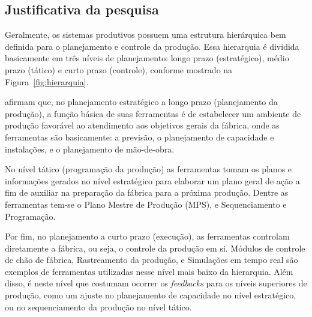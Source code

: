 \subsection{Justificativa da pesquisa} \label{subsec:justif}
    
    Geralmente, os sistemas produtivos possuem uma estrutura hierárquica bem definida para o planejamento e controle da produção. Essa hierarquia é dividida basicamente em três níveis de planejamento: longo prazo (estratégico), médio prazo (tático) e curto prazo (controle), conforme mostrado na Figura~\ref{fig:hierarquia}.
    
    
    
     afirmam que, no planejamento estratégico a longo prazo (planejamento da produção), a função básica de suas ferramentas é de estabelecer um ambiente de produção favorável ao atendimento aos objetivos gerais da fábrica, onde as ferramentas são basicamente: a previsão, o planejamento de capacidade e instalações, e o planejamento de mão-de-obra. 
    
    
    No nível tático (programação da produção) as ferramentas tomam os planos e informações gerados no nível estratégico para elaborar um plano geral de ação a fim de auxiliar na preparação da fábrica para a próxima produção. Dentre as ferramentas tem-se o Plano Mestre de Produção (MPS), e Sequenciamento e Programação.
    
    
    Por fim, no planejamento a curto prazo (execução), as ferramentas controlam diretamente a fábrica, ou seja, o controle da produção em si. Módulos de controle de chão de fábrica, Rastreamento da produção, e Simulações em tempo real são exemplos de ferramentas utilizadas nesse nível mais baixo da hierarquia. Além disso, é neste nível que costumam ocorrer os \textit{feedbacks} para os níveis superiores de produção, como um ajuste no planejamento de capacidade no nível estratégico, ou no sequenciamento da produção no nível tático.
    
